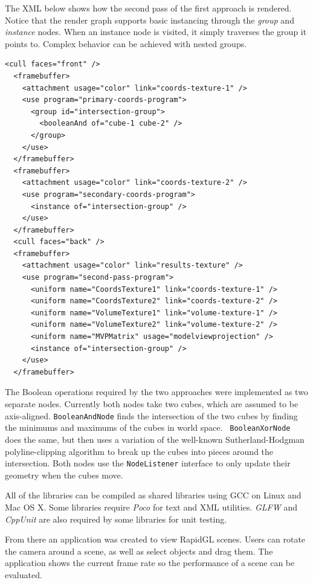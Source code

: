 \documentclass{article}
\begin{document}
The XML below shows how the second pass of the first approach is rendered.
Notice that the render graph supports basic instancing through the {\em group}
and {\em instance} nodes.  When an instance node is visited, it simply traverses
the group it points to.  Complex behavior can be achieved with nested groups.

\begin{Verbatim}[fontsize=\small]
  <cull faces="front" />
  <framebuffer>
    <attachment usage="color" link="coords-texture-1" />
    <use program="primary-coords-program">
      <group id="intersection-group">
        <booleanAnd of="cube-1 cube-2" />
      </group>
    </use>
  </framebuffer>
  <framebuffer>
    <attachment usage="color" link="coords-texture-2" />
    <use program="secondary-coords-program">
      <instance of="intersection-group" />
    </use>
  </framebuffer>
  <cull faces="back" />
  <framebuffer>
    <attachment usage="color" link="results-texture" />
    <use program="second-pass-program">
      <uniform name="CoordsTexture1" link="coords-texture-1" />
      <uniform name="CoordsTexture2" link="coords-texture-2" />
      <uniform name="VolumeTexture1" link="volume-texture-1" />
      <uniform name="VolumeTexture2" link="volume-texture-2" />
      <uniform name="MVPMatrix" usage="modelviewprojection" />
      <instance of="intersection-group" />
    </use>
  </framebuffer>
\end{Verbatim}

The Boolean operations required by the two approaches were implemented as two
separate nodes.  Currently both nodes take two cubes, which are assumed to be
axis-aligned.  {\tt BooleanAndNode} finds the intersection of the two cubes by
finding the minimums and maximums of the cubes in world space.  {\tt
BooleanXorNode} does the same, but then uses a variation of the well-known
Sutherland-Hodgman polyline-clipping algorithm to break up the cubes into pieces
around the intersection.  Both nodes use the {\tt NodeListener} interface to
only update their geometry when the cubes move.

All of the libraries can be compiled as shared libraries using GCC on Linux and
Mac OS X.  Some libraries require {\em Poco} for text and XML utilities.  {\em
GLFW} and {\em CppUnit} are also required by some libraries for unit testing.

From there an application was created to view RapidGL scenes.  Users can
rotate the camera around a scene, as well as select objects and drag them.  The
application shows the current frame rate so the performance of a scene can be
evaluated.
\end{document}

